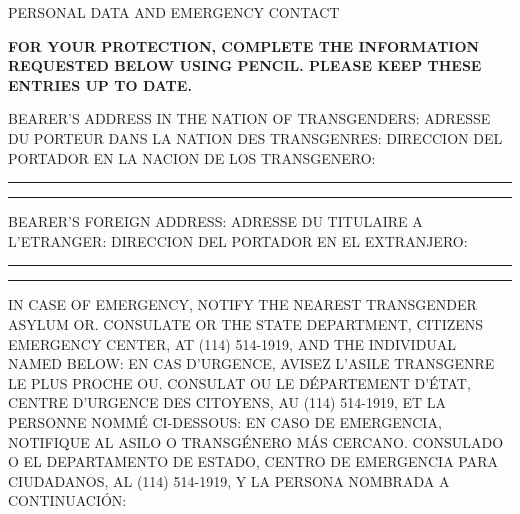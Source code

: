 \newpage
{}
\color{Blue}
\begin{center}
    {\Large PERSONAL DATA AND EMERGENCY CONTACT}
\end{center}
{
\begin{spacing}{1.2}
\bfseries\sffamily\fontsize{5}{5}\selectfont
\noindent FOR YOUR PROTECTION, COMPLETE THE INFORMATION REQUESTED BELOW USING PENCIL. PLEASE KEEP THESE ENTRIES UP TO DATE.
\newline
\end{spacing}
}
\vspace*{0.1in}
{
\begin{spacing}{1.2}
\sffamily\fontsize{5}{5}\selectfont
\noindent BEARER'S ADDRESS IN THE NATION OF TRANSGENDERS:
\newline
ADRESSE DU PORTEUR DANS LA NATION DES TRANSGENRES:
\newline
DIRECCION DEL PORTADOR EN LA NACION DE LOS TRANSGENERO:
\end{spacing}
}
\vspace{0.3in}
\hrule
\vspace{0.2in}
\hrule
\vspace{0.1in}
{
\begin{spacing}{1.2}
\sffamily\fontsize{5}{5}\selectfont
\noindent BEARER'S FOREIGN ADDRESS:
\newline
ADRESSE DU TITULAIRE A L'ETRANGER:
\newline
DIRECCION DEL PORTADOR EN EL EXTRANJERO:
\end{spacing}
}
\vspace{0.3in}
\hrule
\vspace{0.2in}
\hrule
\vspace{0.1in}
{
\begin{spacing}{1.2}
\sffamily\fontsize{5}{5}\selectfont
\noindent IN CASE OF EMERGENCY, NOTIFY THE NEAREST TRANSGENDER ASYLUM OR. CONSULATE OR THE STATE DEPARTMENT, CITIZENS EMERGENCY CENTER, AT (114) 514-1919, AND THE INDIVIDUAL NAMED BELOW:
\newline
\vspace*{0.1in}
EN CAS D'URGENCE, AVISEZ L'ASILE TRANSGENRE LE PLUS PROCHE OU. CONSULAT OU LE DÉPARTEMENT D'ÉTAT, CENTRE D'URGENCE DES CITOYENS, AU (114) 514-1919, ET LA PERSONNE NOMMÉ CI-DESSOUS:
\newline
\vspace*{0.1in}
EN CASO DE EMERGENCIA, NOTIFIQUE AL ASILO O TRANSGÉNERO MÁS CERCANO. CONSULADO O EL DEPARTAMENTO DE ESTADO, CENTRO DE EMERGENCIA PARA CIUDADANOS, AL (114) 514-1919, Y LA PERSONA NOMBRADA A CONTINUACIÓN:
\end{spacing}
}
